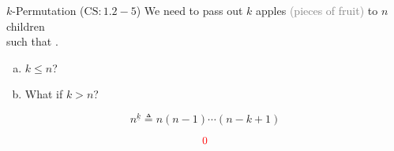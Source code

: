 
\begin{frame}{}
  \centerline{\Large {}}
\end{frame}

\begin{frame}{}
  \begin{exampleblock}{$k$-Permutation ($\text{CS}: 1.2-5$)}
    We need to pass out $k$  apples \textcolor{gray}{(pieces of fruit)} to $n$ children \\
    such that .

    \begin{enumerate}[(a)]
      \item $k \le n$?
      \item What if $k > n$?
    \end{enumerate}
  \end{exampleblock}

  \pause
  \[
    n^{\underline{k}} \triangleq n (n-1) \cdots (n-k+1)
  \]

  \pause
  \[
    \textcolor{red}{0}
  \]
\end{frame}

